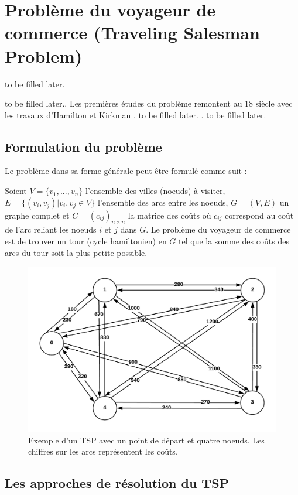 \section{Problème du voyageur de commerce (Traveling Salesman Problem)}to be filled later.

to be filled later.. Les premières études du problème remontent au $18$ siècle  avec les travaux d'Hamilton et Kirkman \parencite{davendra_traveling_2010}. to be filled later. \parencite{gutin_traveling_2006}. to be filled later.

\subsection{Formulation du problème}
Le problème dans sa forme générale peut être formulé comme suit :

\medskip
Soient $ V = \{v_1,...,v_n\} $ l'ensemble des villes (noeuds) à visiter, $ E = \{ (v_i,v_j) | v_i,v_j \in V \}$ l'ensemble des arcs entre les noeuds, $G = (V,E)$ un graphe complet et $C = (c_{ij})_{n × n}$ la matrice des coûts où $c_{ij}$ correspond au coût de l'arc reliant les noeuds $i$ et $j$ dans $G$. Le problème du voyageur de commerce est de trouver un tour (cycle hamiltonien) en $G$ tel que la somme des coûts des arcs du tour soit la plus petite possible.

\medskip

\begin{figure}[hbt!]
  \centering
  \includegraphics[width=12cm]{images_pfe/TSP_EXAMPLE.png}
  \caption{Exemple d'un TSP avec un point de départ et quatre noeuds. Les chiffres sur les arcs représentent les coûts.}
  \label{fig:tsp-example}
\end{figure}
\FloatBarrier

\subsection{Les approches de résolution du TSP}

